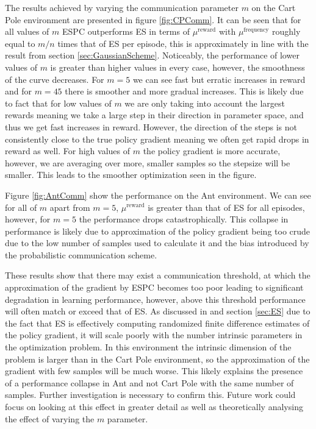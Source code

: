 The results achieved by varying the communication parameter $m$ on the Cart Pole environment are presented in figure \ref{fig:CPComm}. It can be seen that for all values of $m$ ESPC outperforms ES in terms of $\mu^{\text{reward}}$ with $\mu^{\text{frequency}}$ roughly equal to $m/n$ times that of ES per episode, this is approximately in line with the result from section \ref{sec:GaussianScheme}. Noticeably, the performance of lower values of $m$ is greater than higher values in every case, however, the smoothness of the curve decreases. For $m=5$ we can see fast but erratic increases in reward and for $m=45$ there is smoother and more gradual increases. This is likely due to fact that for low values of $m$ we are only taking into account the largest rewards meaning we take a large step in their direction in parameter space, and thus we get fast increases in reward. However, the direction of the steps is not consistently close to the true policy gradient meaning we often get rapid drops in reward as well. For high values of $m$ the policy gradient is more accurate, however, we are averaging over more, smaller samples so the stepsize will be smaller. This leads to the smoother optimization seen in the figure.

Figure \ref{fig:AntComm} show the performance on the Ant environment. We can see for all of $m$ apart from $m=5$, $\mu^{\text{reward}}$ is greater than that of ES for all episodes, however, for $m=5$ the performance drops catastrophically. This collapse in performance is likely due to approximation of the policy gradient being too crude due to the low number of samples used to calculate it and the bias introduced by the probabilistic communication scheme. 

These results show that there may exist a communication threshold, at which the approximation of the gradient by ESPC becomes too poor leading to significant degradation in learning performance, however, above this threshold performance will often match or exceed that of ES. 
As discussed in \cite{ES} and section \ref{sec:ES} due to the fact that ES is effectively computing randomized finite difference estimates of the policy gradient, it will scale poorly with the number intrinsic parameters in the optimization problem.
In this environment the intrinsic dimension of the problem is larger than in the Cart Pole environment, so the approximation of the gradient with few samples will be much worse. This likely explains the presence of a performance collapse in Ant and not Cart Pole with the same number of samples.
Further investigation is necessary to confirm this. Future work could focus on looking at this effect in greater detail as well as theoretically analysing the effect of varying the $m$ parameter.


